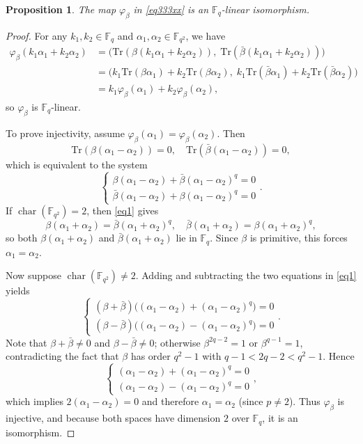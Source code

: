 \documentclass{aims}
\numberwithin{equation}{section}
\newtheorem{proposition}[theorem]{Proposition}
\theoremstyle{definition}
\newcommand{\F}{\mathbb{F}}
\newcommand{\Tr}{\mathrm{Tr}}
\newcommand{\charac}{\operatorname{char}}
\begin{document}
\begin{proposition}
	The map $\varphi_\beta$ in \eqref{eq333xx} is an $\F_q$-linear isomorphism.
\end{proposition}
\begin{proof}
	For any $k_1, k_2 \in \F_q$ and $\alpha_1, \alpha_2 \in \F_{q^2}$, we have
	\[
	\begin{aligned}
		\varphi_\beta(k_1\alpha_1 + k_2\alpha_2)
		&= \bigl( \Tr(\beta(k_1\alpha_1 + k_2\alpha_2)),\; \Tr(\bar{\beta}(k_1\alpha_1 + k_2\alpha_2)) \bigr) \\
		&= \bigl( k_1\Tr(\beta\alpha_1) + k_2\Tr(\beta\alpha_2),\; k_1\Tr(\bar{\beta}\alpha_1) + k_2\Tr(\bar{\beta}\alpha_2) \bigr) \\
		&= k_1\varphi_\beta(\alpha_1) + k_2\varphi_\beta(\alpha_2),
	\end{aligned}
	\]
	so $\varphi_\beta$ is $\F_q$-linear.
	
	To prove injectivity, assume $\varphi_\beta(\alpha_1) = \varphi_\beta(\alpha_2)$. Then
	\[
	\Tr(\beta(\alpha_1 - \alpha_2)) = 0, \quad\Tr(\bar{\beta}(\alpha_1-\alpha_2)) = 0,
	\]
	which is equivalent to the system
	\begin{equation}\label{eq1}
		\begin{cases}
		\beta(\alpha_1 - \alpha_2) + \bar{\beta}(\alpha_1 - \alpha_2)^q = 0\\
		\bar{\beta}(\alpha_1 - \alpha_2) + \beta(\alpha_1 - \alpha_2)^q = 0
	\end{cases}.
	\end{equation}
	If $\charac(\F_{q^2}) = 2$, then \eqref{eq1} gives
	\[
	\beta(\alpha_1 + \alpha_2) = \bar{\beta}(\alpha_1 + \alpha_2)^q,\quad 
	\bar{\beta}(\alpha_1 + \alpha_2) = \beta(\alpha_1 + \alpha_2)^q,
	\]
	so both $\beta(\alpha_1 + \alpha_2)$ and $\bar{\beta}(\alpha_1 + \alpha_2)$ lie in $\F_q$. Since $\beta$ is primitive, this forces $\alpha_1 = \alpha_2$.
	
	Now suppose $\charac(\F_{q^2}) \neq 2$. Adding and subtracting the two equations in \eqref{eq1} yields
	\[
	\begin{cases}
		(\beta + \bar{\beta})\bigl((\alpha_1 - \alpha_2) + (\alpha_1 - \alpha_2)^q\bigr) = 0\\
		(\beta - \bar{\beta})\bigl((\alpha_1 - \alpha_2) - (\alpha_1 - \alpha_2)^q\bigr) = 0
	\end{cases}.
	\]
	Note that $\beta + \bar{\beta} \neq 0$ and $\beta - \bar{\beta} \neq 0$; otherwise $\beta^{2q-2}=1$ or $\beta^{q-1}=1$, contradicting the fact that $\beta$ has order $q^2-1$ with $q-1 < 2q-2 < q^2-1$. Hence
	\[
	\begin{cases}
		(\alpha_1 - \alpha_2) + (\alpha_1 - \alpha_2)^q = 0\\
		(\alpha_1 - \alpha_2) - (\alpha_1 - \alpha_2)^q = 0
	\end{cases},
	\]
	which implies $2(\alpha_1 - \alpha_2) = 0$ and therefore $\alpha_1 = \alpha_2$ (since $p \neq 2$). Thus $\varphi_\beta$ is injective, and because both spaces have dimension $2$ over $\F_q$, it is an isomorphism.
\end{proof}
\end{document}
